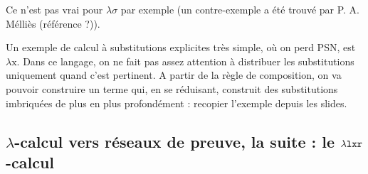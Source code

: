 \documentclass[a4paper, 11pt]{article}
\begin{document}
Ce n'est pas vrai pour $\lambda \sigma$ par exemple (un contre-exemple a été trouvé par P. A. Mélliès (référence ?)).

Un exemple de calcul à substitutions explicites très simple, où on perd PSN, est $\lambda \mathrm{x}$. Dans ce langage, on ne fait pas assez attention à distribuer les substitutions uniquement quand c'est pertinent. A partir de la règle de composition, on va pouvoir construire un terme qui, en se réduisant, construit des substitutions imbriquées de plus en plus profondément : recopier l'exemple depuis les slides.



\subsection{$\lambda$-calcul vers réseaux de preuve, la suite : le ${\lambda \mathtt{l x r}}$-calcul}
\end{document}
